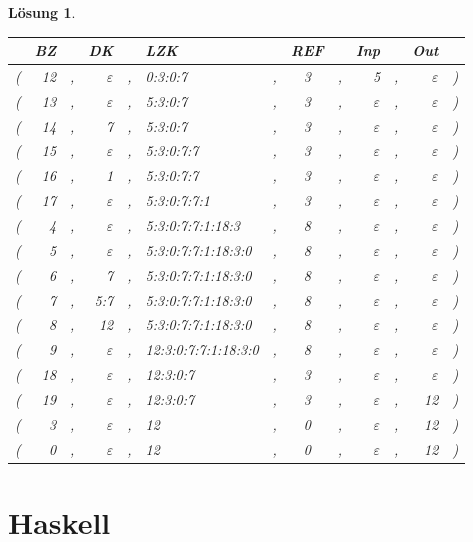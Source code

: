 \documentclass[ngerman,a4paper, 11pt]{scrartcl}
\newcommand*\head{\rowfont[c]{\bfseries}}
\renewcommand{\epsilon}{\varepsilon}
\theoremstyle{break}
\theoremstyle{nonumberplain}
\newtheorem{solution}{Lösung}
\begin{document}
\begin{solution}
\begin{enumerate}[label=(\alph*), leftmargin=*]
		\begin{center}
			\begin{tabu}{rrcrclcccrcrl}
				\toprule
				\head &BZ && DK && LZK && REF && Inp && Out \\
				\midrule \midrule
				(& 12 &,& $\epsilon$ &,& 0:3:0:7 &,& 3 &,& 5 &,& $\epsilon$ &) \\
				(& 13 &,& $\epsilon$ &,& 5:3:0:7 &,& 3 &,& $\epsilon$ &,& $\epsilon$ &) \\
				(& 14 &,& 7 &,& 5:3:0:7 &,& 3 &,& $\epsilon$ &,& $\epsilon$ &) \\
				(& 15 &,& $\epsilon$ &,& 5:3:0:7:7 &,& 3 &,& $\epsilon$ &,& $\epsilon$ &) \\
				(& 16 &,& 1 &,& 5:3:0:7:7 &,& 3 &,& $\epsilon$ &,& $\epsilon$ &) \\
				(& 17 &,& $\epsilon$ &,& 5:3:0:7:7:1 &,& 3 &,& $\epsilon$ &,& $\epsilon$ &) \\
				(& 4 &,& $\epsilon$ &,& 5:3:0:7:7:1:18:3 &,& 8 &,& $\epsilon$ &,& $\epsilon$ &) \\
				(& 5 &,& $\epsilon$ &,& 5:3:0:7:7:1:18:3:0 &,& 8 &,& $\epsilon$ &,& $\epsilon$ &) \\
				(& 6 &,& 7 &,& 5:3:0:7:7:1:18:3:0 &,& 8 &,& $\epsilon$ &,& $\epsilon$ &) \\
				(& 7 &,& 5:7 &,& 5:3:0:7:7:1:18:3:0 &,& 8 &,& $\epsilon$ &,& $\epsilon$ &) \\
				(& 8 &,& 12 &,& 5:3:0:7:7:1:18:3:0 &,& 8 &,& $\epsilon$ &,& $\epsilon$ &) \\
				(& 9 &,& $\epsilon$ &,& 12:3:0:7:7:1:18:3:0 &,& 8 &,& $\epsilon$ &,& $\epsilon$ &) \\
				(& 18 &,& $\epsilon$ &,& 12:3:0:7 &,& 3 &,& $\epsilon$ &,& $\epsilon$ &) \\
				(& 19 &,& $\epsilon$ &,& 12:3:0:7 &,& 3 &,& $\epsilon$ &,& 12 &) \\
				(& 3 &,& $\epsilon$ &,& 12 &,& 0 &,& $\epsilon$ &,& 12 &) \\
				(& 0 &,& $\epsilon$ &,& 12 &,& 0 &,& $\epsilon$ &,& 12 &) \\
				\bottomrule
			\end{tabu}
		\end{center}
	\end{enumerate}
\end{solution}

\section{Haskell}
\end{document}
